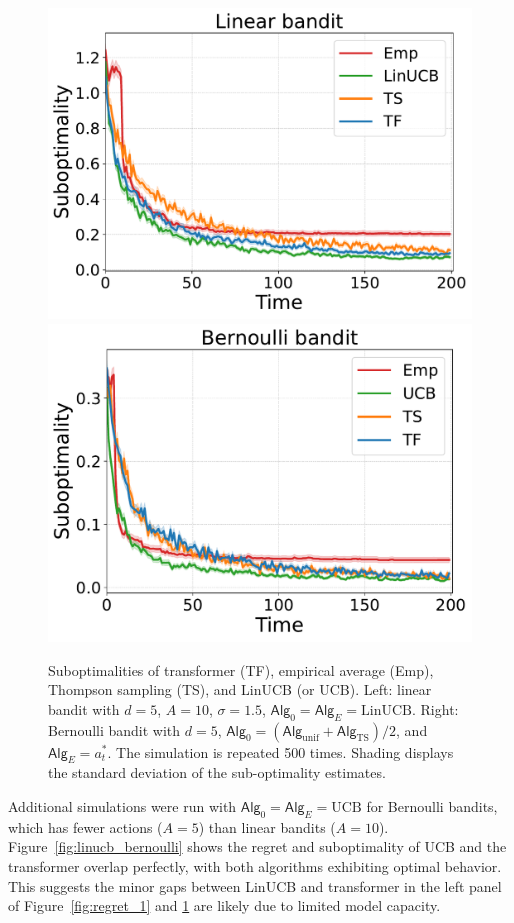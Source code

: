 \documentclass[10pt]{article}
\newcommand{\<}{\left\langle}
\renewcommand{\>}{\right\rangle}
\newcommand{\LinUCB}{{\mathrm{LinUCB}}}
\newcommand{\UCB}{{\mathrm{UCB}}}
\newcommand{\TS}{{\mathrm{TS}}}
\newcommand{\action}{{a}}
\newcommand{\sAlg}{{\mathsf{Alg}}}
\newcommand{\shortexp}{{E}}
\newcommand{\Numact}{{A}}
\begin{document}
\begin{figure}[ht]
\centering  
\includegraphics[width=0.46\linewidth]{Sections/figs/record_2_cum_False.pdf}
\includegraphics[width=0.45\linewidth]{Sections/figs/record_1_cum_False.pdf}
\caption{Suboptimalities of transformer (TF), empirical average (Emp), Thompson sampling (TS), and LinUCB (or UCB). Left: linear bandit with $d=5$, $A=10$, $\sigma=1.5$, $\sAlg_0=\sAlg_\shortexp=\LinUCB$. Right: Bernoulli bandit with $d=5$, $\sAlg_0=(\sAlg_{\mathrm{unif}}+\sAlg_{\TS})/2$, and $\sAlg_\shortexp=\action_t^*$. The simulation is repeated 500 times. Shading displays the standard deviation of the sub-optimality estimates. 
} 
\label{fig:subopt_1} 
\end{figure}


Additional simulations were run with $\sAlg_0=\sAlg_{\shortexp}=\UCB$ for Bernoulli bandits, which has fewer actions ($\Numact=5$) than linear bandits ($\Numact=10$). Figure~\ref{fig:linucb_bernoulli} shows the regret and suboptimality of UCB and the transformer overlap perfectly, with both algorithms exhibiting optimal behavior. This suggests the minor gaps between LinUCB and transformer in the left panel of Figure~\ref{fig:regret_1} and \ref{fig:subopt_1} are likely due to limited model capacity. 
\end{document}
